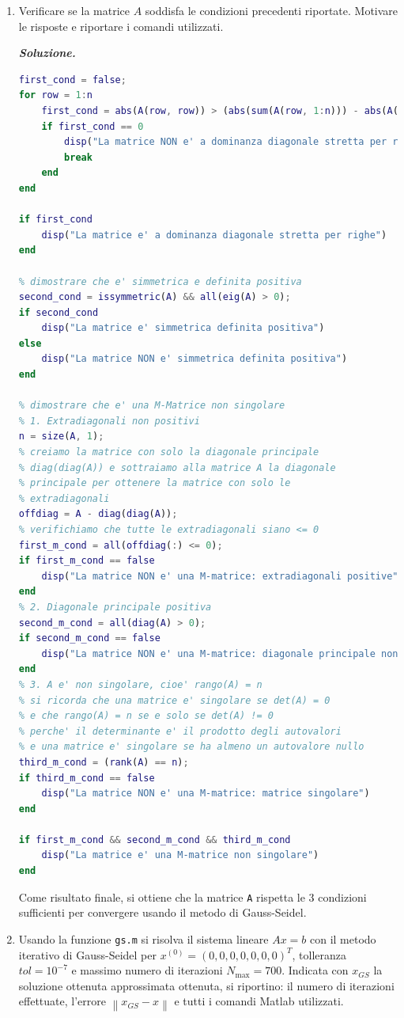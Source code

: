 \begin{enumerate}
    \item Verificare se la matrice $A$ soddisfa le condizioni precedenti riportate. Motivare le risposte e riportare i comandi utilizzati.

    \textcolor{Green3}{\textbf{\emph{Soluzione.}}}
    \begin{lstlisting}[language=MATLAB]
first_cond = false;
for row = 1:n
    first_cond = abs(A(row, row)) > (abs(sum(A(row, 1:n))) - abs(A(row, row)));
    if first_cond == 0
        disp("La matrice NON e' a dominanza diagonale stretta per righe")
        break
    end
end

if first_cond
    disp("La matrice e' a dominanza diagonale stretta per righe")
end

% dimostrare che e' simmetrica e definita positiva
second_cond = issymmetric(A) && all(eig(A) > 0);
if second_cond
    disp("La matrice e' simmetrica definita positiva")
else
    disp("La matrice NON e' simmetrica definita positiva")
end

% dimostrare che e' una M-Matrice non singolare
% 1. Extradiagonali non positivi
n = size(A, 1);
% creiamo la matrice con solo la diagonale principale
% diag(diag(A)) e sottraiamo alla matrice A la diagonale
% principale per ottenere la matrice con solo le
% extradiagonali
offdiag = A - diag(diag(A));
% verifichiamo che tutte le extradiagonali siano <= 0
first_m_cond = all(offdiag(:) <= 0);
if first_m_cond == false
    disp("La matrice NON e' una M-matrice: extradiagonali positive")
end
% 2. Diagonale principale positiva
second_m_cond = all(diag(A) > 0);
if second_m_cond == false
    disp("La matrice NON e' una M-matrice: diagonale principale non positiva")
end
% 3. A e' non singolare, cioe' rango(A) = n
% si ricorda che una matrice e' singolare se det(A) = 0
% e che rango(A) = n se e solo se det(A) != 0
% perche' il determinante e' il prodotto degli autovalori
% e una matrice e' singolare se ha almeno un autovalore nullo
third_m_cond = (rank(A) == n);
if third_m_cond == false
    disp("La matrice NON e' una M-matrice: matrice singolare")
end

if first_m_cond && second_m_cond && third_m_cond
    disp("La matrice e' una M-matrice non singolare")
end\end{lstlisting}
    Come risultato finale, si ottiene che la matrice \texttt{A} rispetta le 3 condizioni sufficienti per convergere usando il metodo di Gauss-Seidel.


    \item \label{item: punto d - 24-07-2025} Usando la funzione \texttt{gs.m} si risolva il sistema lineare $Ax = b$ con il metodo iterativo di Gauss-Seidel per $x^{(0)} = \left(0, 0, 0, 0, 0, 0, 0\right)^{T}$, tolleranza $tol = 10^{-7}$ e massimo numero di iterazioni $N_{\max} = 700$. Indicata con $x_{GS}$ la soluzione ottenuta approssimata ottenuta, si riportino: il numero di iterazioni effettuate, l'errore $\left\| x_{GS} - x \right\|$ e tutti i comandi Matlab utilizzati.


\end{enumerate}
